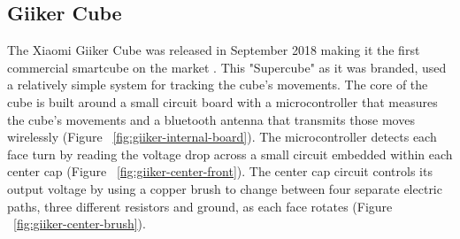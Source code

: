 \subsection{Giiker Cube}
The Xiaomi Giiker Cube was released in September 2018 making it the first commercial smartcube on the market \cite{giiker-thecubicle}.
This "Supercube" as it was branded, used a relatively simple system for tracking the cube's movements.
The core of the cube is built around a small circuit board with a microcontroller that measures the cube's movements and a bluetooth antenna that transmits those moves wirelessly (Figure ~\ref{fig:giiker-internal-board}).
The microcontroller detects each face turn by reading the voltage drop across a small circuit embedded within each center cap (Figure ~\ref{fig:giiker-center-front}).
The center cap circuit controls its output voltage by using a copper brush to change between four separate electric paths, three different resistors and ground, as each face rotates (Figure ~\ref{fig:giiker-center-brush}). \cite{giiker-internals}

